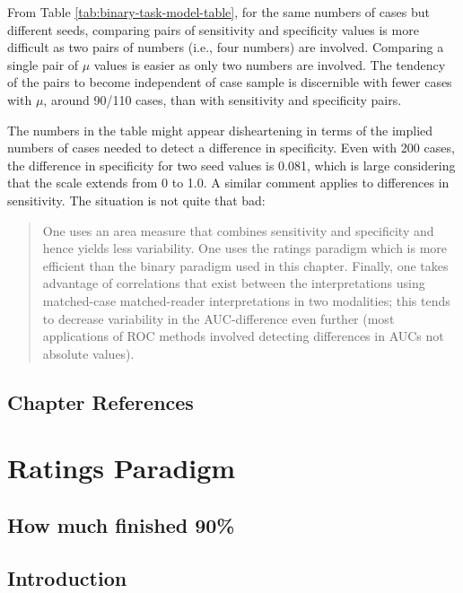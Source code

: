\documentclass[
]{book}
\begin{document}
From Table \ref{tab:binary-task-model-table}, for the same numbers of cases but different seeds, comparing pairs of sensitivity and specificity values is more difficult as two pairs of numbers (i.e., four numbers) are involved. Comparing a single pair of \(\mu\) values is easier as only two numbers are involved. The tendency of the pairs to become independent of case sample is discernible with fewer cases with \(\mu\), around 90/110 cases, than with sensitivity and specificity pairs.

The numbers in the table might appear disheartening in terms of the implied numbers of cases needed to detect a difference in specificity. Even with 200 cases, the difference in specificity for two seed values is 0.081, which is large considering that the scale extends from 0 to 1.0. A similar comment applies to differences in sensitivity. The situation is not quite that bad:

\begin{quote}
One uses an area measure that combines sensitivity and specificity and hence yields less variability. One uses the ratings paradigm which is more efficient than the binary paradigm used in this chapter. Finally, one takes advantage of correlations that exist between the interpretations using matched-case matched-reader interpretations in two modalities; this tends to decrease variability in the AUC-difference even further (most applications of ROC methods involved detecting differences in AUCs not absolute values).
\end{quote}

\hypertarget{binary-task-model-references}{%
\section{Chapter References}\label{binary-task-model-references}}

\hypertarget{ratings-paradigm}{%
\chapter{Ratings Paradigm}\label{ratings-paradigm}}

\hypertarget{ratings-paradigm-how-much-finished}{%
\section{How much finished 90\%}\label{ratings-paradigm-how-much-finished}}

\hypertarget{ratings-paradigm-introduction}{%
\section{Introduction}\label{ratings-paradigm-introduction}}
\end{document}
